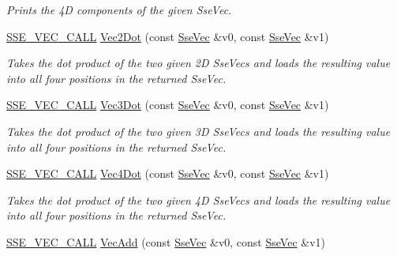 \begin{DoxyCompactItemize}
\begin{DoxyCompactList}\small\item\em Prints the 4\+D components of the given Sse\+Vec. \end{DoxyCompactList}\item 
\hyperlink{ssevec__math__defs_8h_a97454f977a5281455cecacce1e8ba670}{S\+S\+E\+\_\+\+V\+E\+C\+\_\+\+C\+A\+L\+L} \hyperlink{group___s_i_m_d_vec_math_ga6bd433144b73ee2858195fc380e97846}{Vec2\+Dot} (const \hyperlink{namespacegofxmath_a634570ddcd2496053ee966227080e02f}{Sse\+Vec} \&v0, const \hyperlink{namespacegofxmath_a634570ddcd2496053ee966227080e02f}{Sse\+Vec} \&v1)
\begin{DoxyCompactList}\small\item\em Takes the dot product of the two given 2\+D Sse\+Vecs and loads the resulting value into all four positions in the returned Sse\+Vec. \end{DoxyCompactList}\item 
\hyperlink{ssevec__math__defs_8h_a97454f977a5281455cecacce1e8ba670}{S\+S\+E\+\_\+\+V\+E\+C\+\_\+\+C\+A\+L\+L} \hyperlink{group___s_i_m_d_vec_math_ga9c49b81f2971aa5fbc103517738fbef2}{Vec3\+Dot} (const \hyperlink{namespacegofxmath_a634570ddcd2496053ee966227080e02f}{Sse\+Vec} \&v0, const \hyperlink{namespacegofxmath_a634570ddcd2496053ee966227080e02f}{Sse\+Vec} \&v1)
\begin{DoxyCompactList}\small\item\em Takes the dot product of the two given 3\+D Sse\+Vecs and loads the resulting value into all four positions in the returned Sse\+Vec. \end{DoxyCompactList}\item 
\hyperlink{ssevec__math__defs_8h_a97454f977a5281455cecacce1e8ba670}{S\+S\+E\+\_\+\+V\+E\+C\+\_\+\+C\+A\+L\+L} \hyperlink{group___s_i_m_d_vec_math_gaad124f4ea11c4c588206b762284c86d7}{Vec4\+Dot} (const \hyperlink{namespacegofxmath_a634570ddcd2496053ee966227080e02f}{Sse\+Vec} \&v0, const \hyperlink{namespacegofxmath_a634570ddcd2496053ee966227080e02f}{Sse\+Vec} \&v1)
\begin{DoxyCompactList}\small\item\em Takes the dot product of the two given 4\+D Sse\+Vecs and loads the resulting value into all four positions in the returned Sse\+Vec. \end{DoxyCompactList}\item 
\hyperlink{ssevec__math__defs_8h_a97454f977a5281455cecacce1e8ba670}{S\+S\+E\+\_\+\+V\+E\+C\+\_\+\+C\+A\+L\+L} \hyperlink{group___s_i_m_d_vec_math_ga69a2cb46cd6fcbe12e62c7d9c28598f1}{Vec\+Add} (const \hyperlink{namespacegofxmath_a634570ddcd2496053ee966227080e02f}{Sse\+Vec} \&v0, const \hyperlink{namespacegofxmath_a634570ddcd2496053ee966227080e02f}{Sse\+Vec} \&v1)

\end{DoxyCompactItemize}
